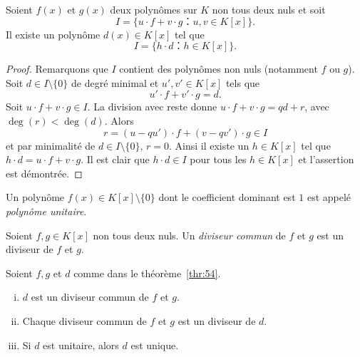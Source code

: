 \begin{theorem}
  \label{thr:54}
  Soient $f(x)$ et $g(x)$ deux polynômes sur $K$ non tous deux nuls et soit 
  \begin{displaymath}
    I = \{ u ⋅ f + v ⋅ g ： u,v ∈ K[x]\}.
  \end{displaymath}
  Il existe un  polynôme $d(x)∈K[x]$ tel que
  \begin{equation}
    \label{eq:51}
    I = \{ h ⋅ d ： h ∈ K[x]\}. 
  \end{equation}
\end{theorem}

\begin{proof}
  Remarquons que $I$ contient des polynômes non nuls (notamment $f$ ou $g$). Soit $d ∈ I \setminus \{0\}$ de degré minimal et $u',v' ∈ K[x]$ tels que
  \begin{displaymath}
    u' ⋅ f + v' ⋅g = d. 
  \end{displaymath}
  Soit $u⋅f + v⋅ g ∈ I$. La division avec reste donne $u⋅f + v⋅ g = qd +r$, avec $\deg(r) < \deg(d)$. Alors
  \begin{displaymath}
    r = (u - qu') ⋅ f + (v - qv') ⋅ g ∈ I
  \end{displaymath}
  et par minimalité de $d ∈ I \setminus\{0\}$, $r=0$. Ainsi il existe un $h∈K[x]$ tel que $h⋅d =  u⋅f + v⋅ g$. Il est clair que $h⋅d ∈I$ pour tous les $h ∈K[x]$ et l'assertion est démontrée.   
\end{proof}


\begin{definition}
  \label{def:54}
  Un polynôme $f(x) ∈ K[x] \setminus \{0\}$  dont le coefficient dominant est $1$ est appelé \emph{polynôme unitaire}. 
\end{definition}


\begin{definition}
  \label{def:55}
  Soient $f,g ∈ K[x]$ non tous deux nuls. Un \emph{diviseur commun} de $f$ et $g$  est un diviseur de $f$ et $g$. 
\end{definition}

\begin{theorem}
  \label{thr:55}
  Soient $f, g$ et $d$  comme dans le  théorème~\ref{thr:54}.
  \begin{enumerate}[i)]
  \item $d$ est un diviseur commun de $f$ et $g$. \label{item:24}
  \item Chaque diviseur commun de $f$ et $g$ est un diviseur de $d$. \label{item:25}
  \item Si $d$ est unitaire, alors $d$ est unique.  \label{item:26}
  \end{enumerate}
\end{theorem}

